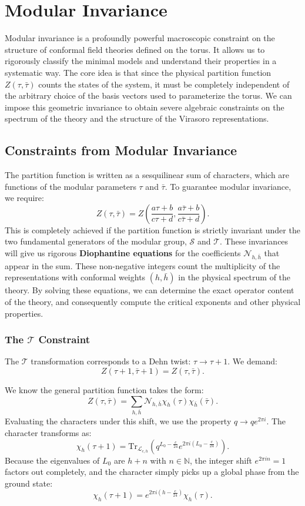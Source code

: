 \section{Modular Invariance}

Modular invariance is a profoundly powerful macroscopic constraint on the structure of conformal field theories defined on the torus. It allows us to rigorously classify the minimal models and understand their properties in a systematic way. The core idea is that since the physical partition function $Z(\tau, \bar{\tau})$ counts the states of the system, it must be completely independent of the arbitrary choice of the basis vectors used to parameterize the torus. We can impose this geometric invariance to obtain severe algebraic constraints on the spectrum of the theory and the structure of the Virasoro representations.

\subsection{Constraints from Modular Invariance}

The partition function is written as a sesquilinear sum of characters, which are functions of the modular parameters $\tau$ and $\bar{\tau}$. To guarantee modular invariance, we require:
\[
    Z(\tau, \bar{\tau}) = Z\left(\frac{a\tau + b}{c\tau + d}, \frac{a\bar{\tau} + b}{c\bar{\tau} + d}\right).
\]
This is completely achieved if the partition function is strictly invariant under the two fundamental generators of the modular group, $\mathcal{S}$ and $\mathcal{T}$. These invariances will give us rigorous \textbf{Diophantine equations} for the coefficients $\mathcal{N}_{h,\bar{h}}$ that appear in the sum. These non-negative integers count the multiplicity of the representations with conformal weights $(h, \bar{h})$ in the physical spectrum of the theory. By solving these equations, we can determine the exact operator content of the theory, and consequently compute the critical exponents and other physical properties.

\subsubsection{The $\mathcal{T}$ Constraint}

The $\mathcal{T}$ transformation corresponds to a Dehn twist: $\tau \to \tau + 1$. We demand:
\[
    Z(\tau + 1, \bar{\tau} + 1) = Z(\tau, \bar{\tau}).
\]

We know the general partition function takes the form:
\[
    Z(\tau, \bar{\tau}) = \sum_{h,\bar{h}} \mathcal{N}_{h,\bar{h}}\chi_h(\tau)\chi_{\bar{h}}(\bar{\tau}).
\]
Evaluating the characters under this shift, we use the property $q \to q e^{2\pi i}$. The character transforms as:
\[
    \chi_h (\tau+1) = \mathrm{Tr}_{\mathcal{L}_{c,h}} \left( q^{L_0 - \frac{c}{24}} e^{2\pi i \left(L_0 - \frac{c}{24}\right)} \right).
\]
Because the eigenvalues of $L_0$ are $h + n$ with $n \in \mathbb{N}$, the integer shift $e^{2\pi i n} = 1$ factors out completely, and the character simply picks up a global phase from the ground state:
\[
    \chi_h (\tau+1) = e^{2 \pi i \left(h - \frac{c}{24}\right)} \chi_h(\tau).
\]

